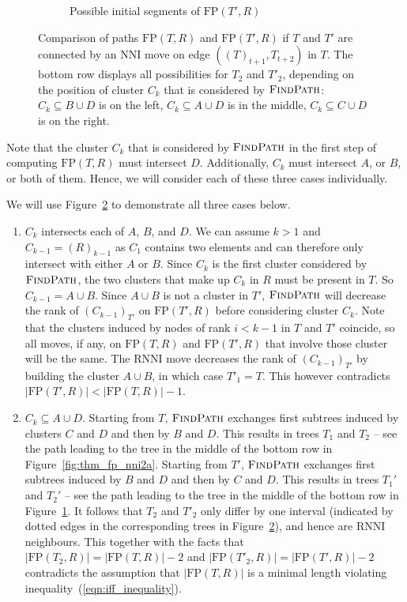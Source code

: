 \documentclass[11pt]{amsart}
\newcommand{\rnni}{\mathrm{RNNI}}
\newcommand{\findpath}{\textsc{FindPath}}
\newcommand{\nni}{\mathrm{NNI}}
\newcommand{\fp}{\mathrm{FP}}
\begin{document}
\begin{enumerate}[label = 1.{\arabic*}]
\begin{figure}[ht]
\begin{subfigure}[b]{.45\textwidth}
		\vspace{12pt}
		\caption{Possible initial segments of $\fp(T', R)$}
		\label{fig:thm_fp_nni2b}
	\end{subfigure}
	\caption{Comparison of paths $\fp(T, R)$ and $\fp(T', R)$ if $T$ and $T'$ are connected by an $\nni$ move on edge $((T)_{t+1},T_{t+2})$ in $T$.
	The bottom row displays all possibilities for $T_2$ and $T'_2$, depending on the position of cluster $C_k$ that is considered by $\findpath$:
	${C_k \subseteq B \cup D}$ is on the left, ${C_k \subseteq A \cup D}$ is in the middle, ${C_k \subseteq C \cup D}$ is on the right.}
	\label{fig:thm_fp_nni}
\end{figure}

Note that the cluster $C_k$ that is considered by $\findpath$ in the first step of computing $\fp(T, R)$ must intersect $D$.
Additionally, $C_k$ must intersect $A$, or $B$, or both of them.
Hence, we will consider each of these three cases individually.

We will use Figure~\ref{fig:thm_fp_nni} to demonstrate all three cases below.

\begin{enumerate}[label = \theenumi.\arabic*]
\item $C_k$ intersects each of $A$, $B$, and $D$.
We can assume $k > 1$ and $C_{k-1} = (R)_{k-1}$ as $C_1$ contains two elements and can therefore only intersect with either $A$ or $B$.
Since $C_k$ is the first cluster considered by $\findpath$, the two clusters that make up $C_k$ in $R$ must be present in $T$.
So $C_{k-1} = A \cup B$.
Since $A \cup B$ is not a cluster in $T'$, $\findpath$ will decrease the rank of $(C_{k-1})_{T'}$ on $\fp(T', R)$ before considering cluster $C_k$.
Note that the clusters induced by nodes of rank $i < k - 1$ in $T$ and $T'$ coincide, so all moves, if any, on $\fp(T, R)$ and $\fp(T', R)$ that involve those cluster will be the same.
The $\rnni$ move decreases the rank of $(C_{k-1})_{T'}$ by building the cluster $A \cup B$, in which case $T'_1 = T$.
This however contradicts $|\fp(T',R)| < |\fp(T,R)| - 1$.

\item $C_k \subseteq A \cup D$.
\label{deep_case_details}
Starting from $T$, $\findpath$ exchanges first subtrees induced by clusters $C$ and $D$ and then by $B$ and $D$.
This results in trees $T_1$ and $T_2$ -- see the path leading to the tree in the middle of the bottom row in Figure~\ref{fig:thm_fp_nni2a}.
Starting from $T'$, $\findpath$ exchanges first subtrees induced by $B$ and $D$ and then by $C$ and $D$.
This results in trees $T_1'$ and $T_2'$ -- see the path leading to the tree in the middle of the bottom row in Figure~\ref{fig:thm_fp_nni2b}.
It follows that $T_2$ and $T'_2$ only differ by one interval (indicated by dotted edges in the corresponding trees in Figure~\ref{fig:thm_fp_nni}), and hence are $\rnni$ neighbours.
This together with the facts that $|\fp(T_2,R)| = |\fp(T,R)|-2$ and $|\fp(T'_2,R)| = |\fp(T',R)|-2$ contradicts the assumption that $|\fp(T,R)|$ is a minimal length violating inequality~(\ref{eqn:iff_inequality}).


\end{enumerate}
\end{enumerate}
\end{document}

